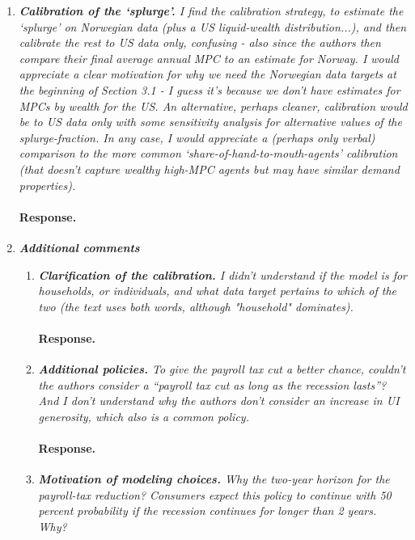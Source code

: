 \documentclass[12pt,letterpaper,english]{article}
\begin{document}
\begin{enumerate}
	\item \textit{\textbf{Calibration of the `splurge'.} I find the calibration strategy, to estimate the `splurge' on Norwegian data (plus a US liquid-wealth distribution...), and then calibrate the rest to US data only, confusing - also since the authors then compare their final average annual MPC to an estimate for Norway. I would appreciate a clear motivation for why we need the Norwegian data targets at the beginning of Section 3.1 - I guess it's because we don't have estimates for MPCs by wealth for the US. An alternative, perhaps cleaner, calibration would be to US data only with some sensitivity analysis for alternative values of the splurge-fraction. In any case, I would appreciate a (perhaps only verbal) comparison to the more common `share-of-hand-to-mouth-agents' calibration (that doesn't capture wealthy high-MPC agents but may have similar demand properties).}
	
	\paragraph{Response.} 

\bigskip
\bigskip

\item \textit{\textbf{Additional comments}} 

	\begin{enumerate}
		\item \textit{\textbf{Clarification of the calibration.} I didn't understand if the model is for households, or individuals, and what data target pertains to which of the two (the text uses both words, although "household" dominates).}
		
		\paragraph{Response.} 
		
		\item \textit{\textbf{Additional policies.} To give the payroll tax cut a better chance, couldn't the authors consider a ``payroll tax cut as long as the recession lasts''? And I don't understand why the authors don't consider an increase in UI generosity, which also is a common policy.}
						
		\paragraph{Response.} 

		\item \textit{\textbf{Motivation of modeling choices.} Why the two-year horizon for the payroll-tax	reduction? Consumers expect this policy to continue with 50 percent	probability if the recession continues for longer than 2 years. Why?}


\end{enumerate}
\end{enumerate}
\end{document}
